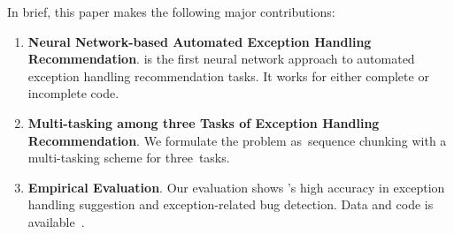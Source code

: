 
In brief, this paper makes the following major contributions:

\begin{enumerate}

\item {\bf Neural Network-based Automated Exception Handling
  Recommendation}. {\tool} is the first neural network approach to
  automated exception handling recommendation tasks.
  It works for either complete or incomplete code.


\item {\bf Multi-tasking among three Tasks of Exception Handling
  Recommendation}. We formulate the problem as~sequence chunking
  with a multi-tasking scheme for three~tasks.

  

\item {\bf Empirical Evaluation}. Our evaluation shows {\tool}'s high
  accuracy in exception handling suggestion and exception-related
  bug detection. Data and code is available~\cite{neurex-website}.


\end{enumerate}




